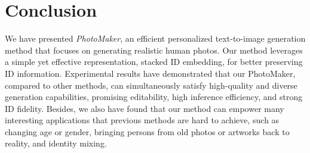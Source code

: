 \section{Conclusion}

We have presented \textit{PhotoMaker}, an efficient personalized text-to-image generation method that focuses on generating realistic human photos.
Our method leverages a simple yet effective representation, stacked ID embedding, for better preserving ID information.
Experimental results have demonstrated that our PhotoMaker, compared to other methods, can simultaneously satisfy high-quality and diverse generation capabilities, promising editability, high inference efficiency, and strong ID fidelity.
Besides, we also have found that our method can empower many interesting applications that previous methods are hard to achieve, such as changing age or gender, bringing persons from old photos or artworks back to reality, and identity mixing.


